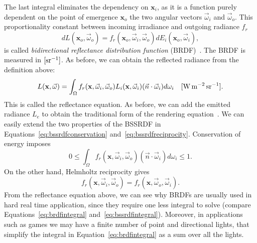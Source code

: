 The last integral eliminates the dependency on $\mathbf{x}_i$, as it is a function purely dependent on the point of emergence $\mathbf{x}_o$ the two angular vectors $\vec{\omega}_i$ and $\vec{\omega}_o$. This proportionality constant between incoming irradiance and outgoing radiance $f_r$
\begin{equation}
\label{eq:brdf}
d L(\mathbf{x}_o, \vec{\omega}_o) = f_r(\mathbf{x}_o, \vec{\omega}_i, \vec{\omega}_o) d E_i(\mathbf{x}_o, \vec{\omega}_i),
\end{equation}
is called \emph{bidirectional reflectance distribution function} (BRDF)~\cite{Nicodemus1977}. The BRDF is measured in $\siunitnospace{\per \steradian}$. As before, we can obtain the reflected radiance from the definition above:
\begin{equation}
\label{eq:brdfintegral}
L(\mathbf{x}, \vec{\omega}) = \int_\Omega f_r(\mathbf{x}, \vec{\omega}_i,  \vec{\omega}_o) L_i(\mathbf{x}, \vec{\omega}_i) (\vec{n} \cdot \vec{\omega}_i) d{\omega}_i  \siunit{\watt \per \square \metre \per \steradian}.
\end{equation}
This is called the reflectance equation. As before, we can add the emitted radiance $L_e$ to obtain the traditional form of the rendering equation~\cite{Kajiya1986}. We can easily extend the two properties of the BSSRDF in Equations~\ref{eq:bssrdfconservation} and~\ref{eq:bssrdfreciprocity}. Conservation of energy imposes
\begin{equation*}
0 \leq \int_\Omega f_r(\mathbf{x}, \vec{\omega}_i,  \vec{\omega}_o)  (\vec{n} \cdot \vec{\omega}_i) d{\omega}_i \leq 1.
\end{equation*}
On the other hand, Helmholtz reciprocity gives
\begin{equation*}
f_r(\mathbf{x}, \vec{\omega}_i,  \vec{\omega}_o) = f_r(\mathbf{x}, \vec{\omega}_o,  \vec{\omega}_i).
\end{equation*}
From the reflectance equation above, we can see why BRDFs are usually used in hard real time application, since they require one less integral to solve (compare Equations~\ref{eq:brdfintegral} and~\ref{eq:bssrdfintegral}). Moreover, in applications such as games we may have a finite number of point and directional lights, that simplify the integral in Equation~\ref{eq:brdfintegral} as a sum over all the lights.

